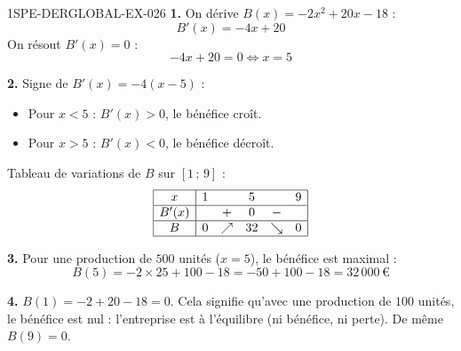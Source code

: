 \begin{corrige}{1SPE-DERGLOBAL-EX-026}
\textbf{1.} On dérive $B(x) = -2x^2 + 20x - 18$ :
\[
B'(x) = -4x + 20
\]
On résout $B'(x) = 0$ :
\[
-4x + 20 = 0 \iff x = 5
\]

\textbf{2.} Signe de $B'(x) = -4(x - 5)$ :
\begin{itemize}
\item Pour $x < 5$ : $B'(x) > 0$, le bénéfice croît.
\item Pour $x > 5$ : $B'(x) < 0$, le bénéfice décroît.
\end{itemize}

Tableau de variations de $B$ sur $[1\,;\,9]$ :
\[
\begin{array}{|c|ccccc|}
\hline
x & 1 & & 5 & & 9 \\
\hline
B'(x) & & + & 0 & - & \\
\hline
B & 0 & \nearrow & 32 & \searrow & 0 \\
\hline
\end{array}
\]

\textbf{3.} Pour une production de $500$ unités ($x = 5$), le bénéfice est maximal :
\[
B(5) = -2 \times 25 + 100 - 18 = -50 + 100 - 18 = \boxed{32\,000\,\text{€}}
\]

\textbf{4.} $B(1) = -2 + 20 - 18 = 0$. Cela signifie qu'avec une production de $100$ unités, le bénéfice est nul : l'entreprise est à l'équilibre (ni bénéfice, ni perte). De même $B(9) = 0$.
\end{corrige}
